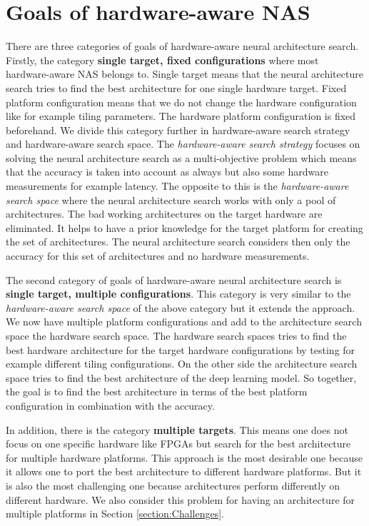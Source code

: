 \documentclass[conference]{IEEEtran}
\begin{document}
\section{Goals of hardware-aware NAS}
\label{section:Goals}
There are three categories of goals of hardware-aware neural architecture search. Firstly, the category \textbf{single target, fixed configurations} where most hardware-aware NAS belongs to. Single target means that the neural architecture search tries to find the best architecture for one single hardware target. Fixed platform configuration means that we do not change the hardware configuration like for example tiling parameters. The hardware platform configuration is fixed beforehand. We divide this category further in hardware-aware search strategy and hardware-aware search space. The \textit{hardware-aware search strategy} focuses on solving the neural architecture search as a multi-objective problem which means that the accuracy is taken into account as always but also some hardware measurements for example latency. The opposite to this is the \textit{hardware-aware search space} where the neural architecture search works with only a pool of architectures. The bad working architectures on the target hardware are eliminated. It helps to have a prior knowledge for the target platform for creating the set of architectures. The neural architecture search considers then only the accuracy for this set of architectures and no hardware measurements.

The second category of goals of hardware-aware neural architecture search is \textbf{single target, multiple configurations}. This category is very similar to the \textit{hardware-aware search space} of the above category but it extends the approach. We now have multiple platform configurations and add to the architecture search space the hardware search space. The hardware search spaces tries to find the best hardware architecture for the target hardware configurations by testing for example different tiling configurations. On the other side the architecture search space tries to find the best architecture of the deep learning model. So together, the goal is to find the best architecture in terms of the best platform configuration in combination with the accuracy. 

In addition, there is the category \textbf{multiple targets}. This means one does not focus on one specific hardware like FPGAs but search for the best architecture for multiple hardware platforms. This approach is the most desirable one because it allows one to port the best architecture to different hardware platforms. But it is also the most challenging one because architectures perform differently on different hardware. We also consider this problem for having an architecture for multiple platforms in Section \ref{section:Challenges}. 
\end{document}
